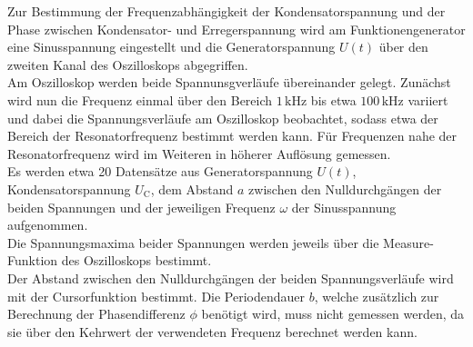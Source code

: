 Zur Bestimmung der Frequenzabhängigkeit der Kondensatorspannung und der Phase zwischen Kondensator- und Erregerspannung wird am Funktionengenerator eine Sinusspannung eingestellt und die Generatorspannung $U(t)$ über den zweiten Kanal des Oszilloskops abgegriffen.\\
Am Oszilloskop werden beide Spannunsgverläufe übereinander gelegt.
Zunächst wird nun die Frequenz einmal über den Bereich $1 \,\si{\kilo\Hz}$ bis etwa $100 \,\si{\kilo\Hz}$ variiert und dabei die Spannungsverläufe am Oszilloskop beobachtet, sodass etwa der Bereich der Resonatorfrequenz bestimmt werden kann.
Für Frequenzen nahe der Resonatorfrequenz wird im Weiteren in höherer Auflösung gemessen.\\
Es werden etwa 20 Datensätze aus Generatorspannung $U(t)$, Kondensatorspannung $U_\text{C}$, dem Abstand $a$ zwischen den Nulldurchgängen der beiden Spannungen und der jeweiligen Frequenz $\omega$ der Sinusspannung aufgenommen.\\
Die Spannungsmaxima beider Spannungen werden jeweils über die Measure-Funktion des Oszilloskops bestimmt.\\
Der Abstand zwischen den Nulldurchgängen der beiden Spannungsverläufe wird mit der Cursorfunktion bestimmt.
Die Periodendauer $b$, welche zusätzlich zur Berechnung der Phasendifferenz $\phi$ benötigt wird, muss nicht gemessen werden, da sie über den Kehrwert der verwendeten Frequenz berechnet werden kann.
